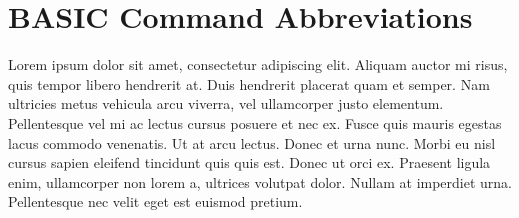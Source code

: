 \chapter{BASIC Command Abbreviations}

Lorem ipsum dolor sit amet, consectetur adipiscing elit. Aliquam auctor mi
risus, quis tempor libero hendrerit at. Duis hendrerit placerat quam et semper.
Nam ultricies metus vehicula arcu viverra, vel ullamcorper justo elementum.
Pellentesque vel mi ac lectus cursus posuere et nec ex. Fusce quis mauris
egestas lacus commodo venenatis. Ut at arcu lectus. Donec et urna nunc. Morbi
eu nisl cursus sapien eleifend tincidunt quis quis est.  Donec ut orci ex.
Praesent ligula enim, ullamcorper non lorem a, ultrices volutpat dolor. Nullam
at imperdiet urna. Pellentesque nec velit eget est euismod pretium.
